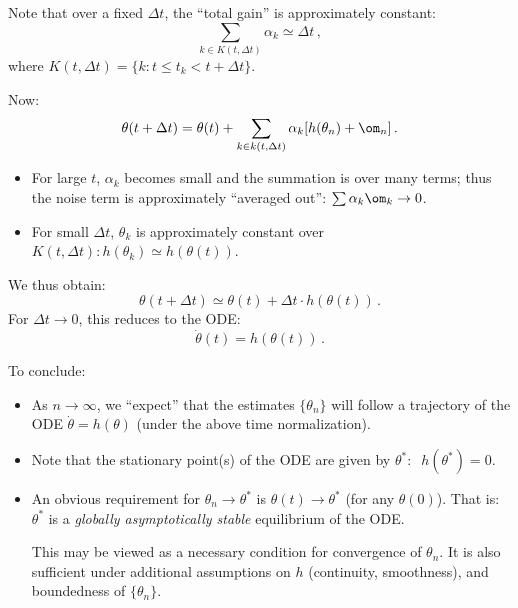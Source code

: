 \begin{center}
\end{center}


Note that over a fixed $\Delta t$, the ``total gain'' is approximately
constant:
$$
\sum_{k\in K(t, \Delta t)} \alpha_k \simeq \Delta t\,,
$$
where $K(t,\Delta t) = \{k: t \le t_k < t+ \Delta t\}$.

Now:
$$
\theta(t+\Delta t) = \theta(t) + \sum_{k\in k(t, \Delta t)} \alpha_k [h(\theta_n)
+\om_n] \,.
$$
\begin{itemize}
\item
For large $t$, $\alpha_k$ becomes small and the summation is over many
terms; thus the noise term is approximately ``averaged out'':
$\sum \alpha_k \om_k \to 0$.
\item
For small $\Delta t$, $\theta_k$ is approximately constant over $K(t, \Delta t):
h(\theta_k) \simeq h(\theta(t))$.
\end{itemize}
We thus obtain:
$$
\theta(t+\Delta t) \simeq \theta(t) +\Delta t\cdot h (\theta(t))\,.
$$
For $\Delta t \to 0$, this reduces to the ODE:
$$
\dot \theta(t) = h(\theta(t))\,.
$$

\medskip

To conclude:
\begin{itemize}
\item
As $n\to\infty$, we ``expect'' that the estimates
$\{\theta_n\}$ will follow a trajectory of the ODE $\dot\theta=h(\theta)$
(under the above time normalization).
\item
Note that the stationary point(s) of the ODE are given by
$\theta^*:\;\; h(\theta^*) = 0$.
\item
An obvious requirement for $\theta_n \to \theta^*$ is
$\theta(t) \to \theta^*$
(for any $\theta(0)$).
That is: $\theta^*$ is a {\em globally asymptotically stable} equilibrium of
the ODE.

This may be viewed as a necessary condition for convergence of
$\theta_n$. It is also sufficient under additional assumptions on
$h$ (continuity, smoothness), and boundedness of $\{\theta_n\}$.
\end{itemize}



